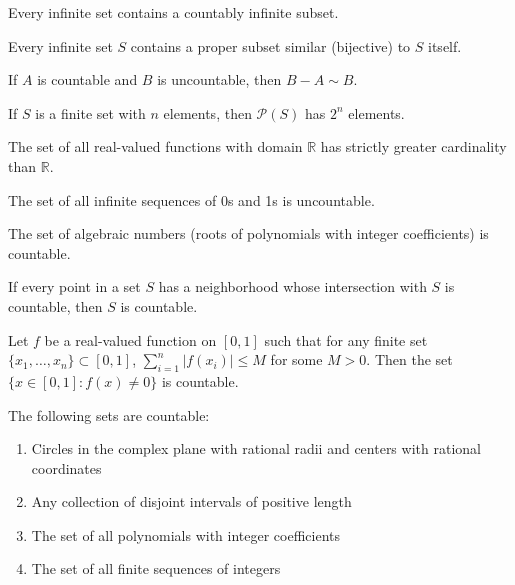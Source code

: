 \begin{theorem}
Every infinite set contains a countably infinite subset.
\end{theorem}

\begin{theorem}
Every infinite set $S$ contains a proper subset similar (bijective) to $S$ itself.
\end{theorem}

\begin{theorem}
If $A$ is countable and $B$ is uncountable, then $B - A \sim B$.
\end{theorem}

\begin{theorem}
If $S$ is a finite set with $n$ elements, then $\mathcal{P}(S)$ has $2^n$ elements.
\end{theorem}

\begin{theorem}
The set of all real-valued functions with domain $\mathbb{R}$ has strictly greater cardinality than $\mathbb{R}$.
\end{theorem}

\begin{theorem}
The set of all infinite sequences of 0s and 1s is uncountable.
\end{theorem}

\begin{theorem}
The set of algebraic numbers (roots of polynomials with integer coefficients) is countable.
\end{theorem}

\begin{theorem}
If every point in a set $S$ has a neighborhood whose intersection with $S$ is countable, then $S$ is countable.
\end{theorem}

\begin{theorem}
Let $f$ be a real-valued function on $[0,1]$ such that for any finite set $\{x_1, \ldots, x_n\} \subset [0,1]$, $\sum_{i=1}^n |f(x_i)| \leq M$ for some $M > 0$. Then the set $\{x \in [0,1] : f(x) \neq 0\}$ is countable.
\end{theorem}

\begin{theorem}
The following sets are countable:
\begin{enumerate}
\item Circles in the complex plane with rational radii and centers with rational coordinates
\item Any collection of disjoint intervals of positive length
\item The set of all polynomials with integer coefficients
\item The set of all finite sequences of integers
\end{enumerate}
\end{theorem}


